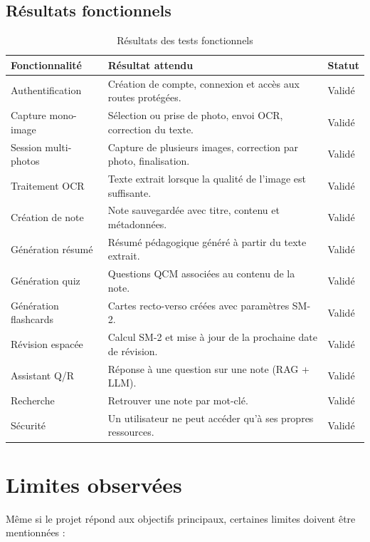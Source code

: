\documentclass[12pt,a4paper]{report}
\begin{document}
\subsection{Résultats fonctionnels}

\begin{table}[H]
\centering
\begin{tabularx}{\textwidth}{|p{4cm}|X|p{2.5cm}|}
\hline
\textbf{Fonctionnalité} & \textbf{Résultat attendu} & \textbf{Statut}\\
\hline
Authentification & Création de compte, connexion et accès aux routes protégées. & Validé\\
\hline
Capture mono-image & Sélection ou prise de photo, envoi OCR, correction du texte. & Validé\\
\hline
Session multi-photos & Capture de plusieurs images, correction par photo, finalisation. & Validé\\
\hline
Traitement OCR & Texte extrait lorsque la qualité de l'image est suffisante. & Validé\\
\hline
Création de note & Note sauvegardée avec titre, contenu et métadonnées. & Validé\\
\hline
Génération résumé & Résumé pédagogique généré à partir du texte extrait. & Validé\\
\hline
Génération quiz & Questions QCM associées au contenu de la note. & Validé\\
\hline
Génération flashcards & Cartes recto-verso créées avec paramètres SM-2. & Validé\\
\hline
Révision espacée & Calcul SM-2 et mise à jour de la prochaine date de révision. & Validé\\
\hline
Assistant Q/R & Réponse à une question sur une note (RAG + LLM). & Validé\\
\hline
Recherche & Retrouver une note par mot-clé. & Validé\\
\hline
Sécurité & Un utilisateur ne peut accéder qu'à ses propres ressources. & Validé\\
\hline
\end{tabularx}
\caption{Résultats des tests fonctionnels}
\label{tab:resultats}
\end{table}

\section{Limites observées}

Même si le projet répond aux objectifs principaux, certaines limites doivent être mentionnées :
\end{document}
